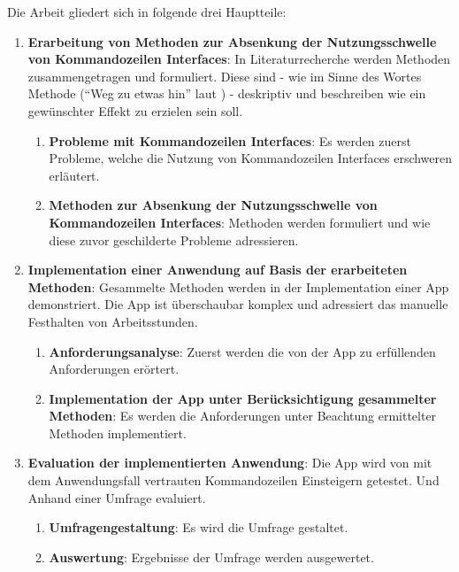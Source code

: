 \documentclass[oneside,bibliography=totocnumbered,BCOR=5mm]{scrbook}
\begin{document}
Die Arbeit gliedert sich in folgende drei Hauptteile:

\begin{enumerate}
  \item \textbf{Erarbeitung von Methoden zur Absenkung der Nutzungsschwelle von Kommandozeilen Interfaces}:
    \smallbreak
    In Literaturrecherche werden Methoden zusammengetragen und formuliert.
    Diese sind - wie im Sinne des Wortes Methode (``Weg zu etwas hin'' laut \cite{duden_methode}) - deskriptiv und beschreiben wie ein gewünschter Effekt zu erzielen sein soll.
    \begin{enumerate}
      \item \textbf{Probleme mit Kommandozeilen Interfaces}:
        \smallbreak
        Es werden zuerst Probleme, welche die Nutzung von Kommandozeilen Interfaces erschweren erläutert.
      \item \textbf{Methoden zur Absenkung der Nutzungsschwelle von Kommandozeilen Interfaces}:
        \smallbreak
        Methoden werden formuliert und wie diese zuvor geschilderte Probleme adressieren.
    \end{enumerate}

  \item \textbf{Implementation einer Anwendung auf Basis der erarbeiteten Methoden}:
    \smallbreak
    Gesammelte Methoden werden in der Implementation einer App demonstriert.
    Die App ist überschaubar komplex und adressiert das manuelle Festhalten von Arbeitsstunden.
    \begin{enumerate}
      \item \textbf{Anforderungsanalyse}:
        \smallbreak
        Zuerst werden die von der App zu erfüllenden Anforderungen erörtert.
      \item \textbf{Implementation der App unter Berücksichtigung gesammelter Methoden}:
        \smallbreak
        Es werden die Anforderungen unter Beachtung ermittelter Methoden implementiert.
    \end{enumerate}

  \item \textbf{Evaluation der implementierten Anwendung}:
    \smallbreak
    Die App wird von mit dem Anwendungsfall vertrauten Kommandozeilen Einsteigern getestet.
    Und Anhand einer Umfrage evaluiert.
    \begin{enumerate}
      \item \textbf{Umfragengestaltung}:
        \smallbreak
        Es wird die Umfrage gestaltet.
      \item \textbf{Auswertung}:
        \smallbreak
        Ergebnisse der Umfrage werden ausgewertet.
    \end{enumerate}
\end{enumerate}
\end{document}
